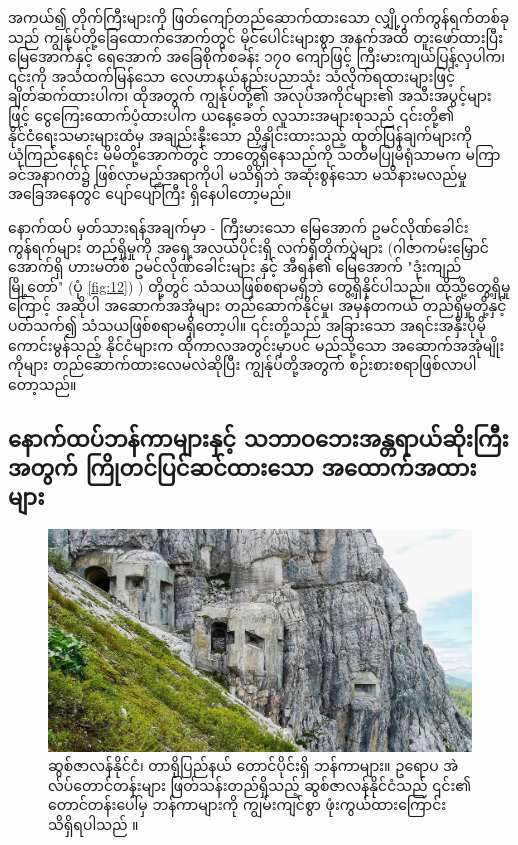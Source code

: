 \documentclass[10pt,twocolumn,letterpaper]{article}
\begin{document}
အကယ်၍ တိုက်ကြီးများကို ဖြတ်ကျော်တည်ဆောက်ထားသော လျှို့ဝှက်ကွန်ရက်တစ်ခုသည် ကျွန်ုပ်တို့ခြေထောက်အောက်တွင် မိုင်ပေါင်းများစွာ အနက်အထိ တူးဖော်ထားပြီး မြေအောက်နှင့် ရေအောက် အခြေစိုက်စခန်း ၁၇၀ ကျော်ဖြင့် ကြီးမားကျယ်ပြန့်လှပါက၊ ၎င်းကို အသံထက်မြန်သော လေဟာနယ်နည်းပညာသုံး သံလိုက်ရထားများဖြင့် ချိတ်ဆက်ထားပါက၊ ထိုအတွက် ကျွန်ုပ်တို့၏ အလုပ်အကိုင်များ၏ အသီးအပွင့်များဖြင့် ငွေကြေးထောက်ပံ့ထားပါက ယနေ့ခေတ် လူသားအများစုသည် ၎င်းတို့၏ နိုင်ငံရေးသမားများထံမှ အချည်းနှီးသော ညှိနှိုင်းထားသည့် ထုတ်ပြန်ချက်များကို ယုံကြည်နေရင်း မိမိတို့အောက်တွင် ဘာတွေရှိနေသည်ကို သတိမပြုမိရုံသာမက မကြာခင်အနာဂတ်၌ ဖြစ်လာမည့်အရာကိုပါ မသိရှိဘဲ အဆုံးစွန်သော မသိနားမလည်မှု အခြေအနေတွင် ပျော်ပျော်ကြီး ရှိနေပါတော့မည်။

နောက်ထပ် မှတ်သားရန်အချက်မှာ - ကြီးမားသော မြေအောက် ဥမင်လိုဏ်ခေါင်းကွန်ရက်များ တည်ရှိမှုကို အရှေ့အလယ်ပိုင်းရှိ လက်ရှိတိုက်ပွဲများ (ဂါဇာကမ်းမြှောင်အောက်ရှိ ဟားမတ်စ် ဥမင်လိုဏ်ခေါင်းများ \cite{38} နှင့် အီရန်၏ မြေအောက် "ဒုံးကျည်မြို့တော်" (ပုံ \ref{fig:12}) \cite{39,40}) တို့တွင် သံသယဖြစ်စရာမရှိဘဲ တွေ့ရှိနိုင်ပါသည်။ ထိုသို့တွေ့ရှိမှုကြောင့် အဆိုပါ အဆောက်အအုံများ တည်ဆောက်နိုင်မှု၊ အမှန်တကယ် တည်ရှိမှုတို့နှင့်ပတ်သက်၍ သံသယဖြစ်စရာမရှိတော့ပါ။ ၎င်းတို့သည် အခြားသော အရင်းအနှီးပိုမိုကောင်းမွန်သည့် နိုင်ငံများက ထိုကာလအတွင်းမှာပင် မည်သို့သော အဆောက်အအုံမျိုးကိုများ တည်ဆောက်ထားလေမလဲဆိုပြီး ကျွန်ုပ်တို့အတွက် စဉ်းစားစရာဖြစ်လာပါတော့သည်။
\subsection{နောက်ထပ်ဘန်ကာများနှင့် သဘာဝဘေးအန္တရာယ်ဆိုးကြီးအတွက် ကြိုတင်ပြင်ဆင်ထားသော အထောက်အထားများ}

\begin{figure}[t]
\begin{center}
\includegraphics[width=1\linewidth]{tyrol.jpg}
\end{center}
   \caption{ဆွစ်ဇာလန်နိုင်ငံ၊ တာရိုပြည်နယ် တောင်ပိုင်းရှိ ဘန်ကာများ။ ဥရောပ အဲလ်ပ်တောင်တန်းများ ဖြတ်သန်းတည်ရှိသည့် ဆွစ်ဇာလန်နိုင်ငံသည် ၎င်း၏ တောင်တန်းပေါ်မှ ဘန်ကာများကို ကျွမ်းကျင်စွာ ဖုံးကွယ်ထားကြောင်း သိရှိရပါသည် \cite{32}။}
\label{fig:7}
\label{fig:onecol}
\end{figure}
\end{document}
